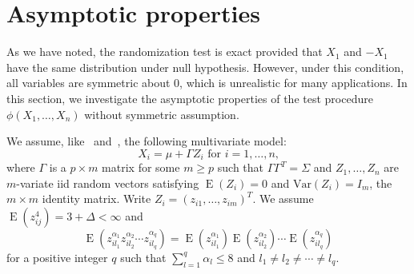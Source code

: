 \documentclass[3p]{elsarticle}
\DeclareMathOperator{\myE}{E}
\theoremstyle{plain}
\theoremstyle{definition}
\theoremstyle{remark}
\begin{document}
%

\section{Asymptotic properties}
As we have noted, the randomization test is exact provided that $X_1$ and $-X_1$ have the same distribution under null hypothesis.
However, under this condition, all variables are symmetric about $0$, which is unrealistic for many applications.
In this section, we investigate the asymptotic properties of the test procedure $\phi(X_1,\ldots,X_n)$ without symmetric assumption.

We assume, like~\citet{Chen2010A} and~\citet{Bai1996Efiect}, the following multivariate model:
\begin{equation}\label{chenC1}
    \textrm{$X_i=\mu+\Gamma Z_i$  for  $i=1,\ldots,n$,}
\end{equation}
where $\Gamma$ is a $p\times m$ matrix for some $m\geq p$ such that $\Gamma\Gamma^T=\Sigma$ and $Z_{1},\ldots, Z_n$ are $m$-variate iid random vectors satisfying $\myE(Z_i)=0$ and $\mathrm{Var}(Z_i)=I_m$, the $m\times m$ identity matrix. Write $Z_i={(z_{i1},\ldots,z_{im})}^T$. We assume $\myE(z_{ij}^4)=3+\Delta<\infty$ and
\begin{equation}\label{chenC2}
    \myE(z_{il_1}^{\alpha_1}z_{il_2}^{\alpha_2}\cdots z_{il_q}^{\alpha_q})=\myE(z_{il_1}^{\alpha_1})\myE(z_{il_2}^{\alpha_2})\cdots \myE(z_{il_q}^{\alpha_q})
\end{equation}
for a positive integer $q$ such that $\sum_{l=1}^q \alpha_l\leq 8$ and $l_1\neq l_2\neq \cdots \neq l_q$.
\end{document}
